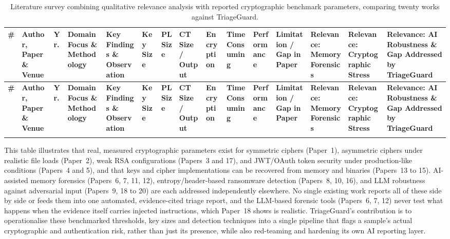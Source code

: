 \documentclass[10pt]{article}
\begin{document}
\small
\sloppy
\begin{longtable}{P{0.4cm} P{5.0cm} P{0.6cm} P{5.1cm} P{5.1cm} P{3.2cm} P{2.9cm} P{3.2cm} P{3.2cm} P{3.2cm} P{3.2cm} P{3.7cm} P{3.4cm} P{3.4cm} P{3.7cm}}
\caption{Literature survey combining qualitative relevance analysis with reported cryptographic benchmark parameters, comparing twenty works against TriageGuard.}
\label{tab:litsurvey} \\
\toprule
\textbf{\#} & \textbf{Author, Paper \& Venue} & \textbf{Yr.} & \textbf{Domain Focus \& Methodology} & \textbf{Key Findings \& Observation} & \textbf{Key Size} & \textbf{PL Size} & \textbf{CT Size / Output} & \textbf{Encryption} & \textbf{Time Consuming} & \textbf{Performance} & \textbf{Limitation / Gap in Paper} & \textbf{Relevance: Memory Forensics} & \textbf{Relevance: Cryptographic Stress} & \textbf{Relevance: AI Robustness \& Gap Addressed by TriageGuard} \\
\midrule
\endfirsthead

\toprule
\textbf{\#} & \textbf{Author, Paper \& Venue} & \textbf{Yr.} & \textbf{Domain Focus \& Methodology} & \textbf{Key Findings \& Observation} & \textbf{Key Size} & \textbf{PL Size} & \textbf{CT Size / Output} & \textbf{Encryption} & \textbf{Time Consuming} & \textbf{Performance} & \textbf{Limitation / Gap in Paper} & \textbf{Relevance: Memory Forensics} & \textbf{Relevance: Cryptographic Stress} & \textbf{Relevance: AI Robustness \& Gap Addressed by TriageGuard} \\
\midrule
\endhead

\bottomrule
\endfoot

\bottomrule
\endlastfoot



\end{longtable}

\vspace{0.5cm}
\noindent This table illustrates that real, measured cryptographic parameters exist for symmetric ciphers (Paper~1),
asymmetric ciphers under realistic file loads (Paper~2), weak RSA configurations (Papers~3 and 17), and JWT/OAuth
token security under production-like conditions (Papers~4 and 5), and that keys and cipher implementations can be
recovered from memory and binaries (Papers~13 to 15). AI-assisted memory forensics (Papers~6, 7, 11, 12),
entropy/header-based ransomware detection (Papers~8, 10, 16), and LLM robustness against adversarial input
(Papers~9, 18 to 20) are each addressed independently elsewhere. No single existing work reports all of these side
by side or feeds them into one automated, evidence-cited triage report, and the LLM-based forensic tools
(Papers~6, 7, 12) never test what happens when the evidence itself carries injected instructions, which Paper~18
shows is realistic. TriageGuard's contribution is to operationalise these benchmarked thresholds, key sizes and
detection techniques into a single pipeline that flags a sample's actual cryptographic and authentication risk,
rather than just its presence, while also red-teaming and hardening its own AI reporting layer.
\end{document}
